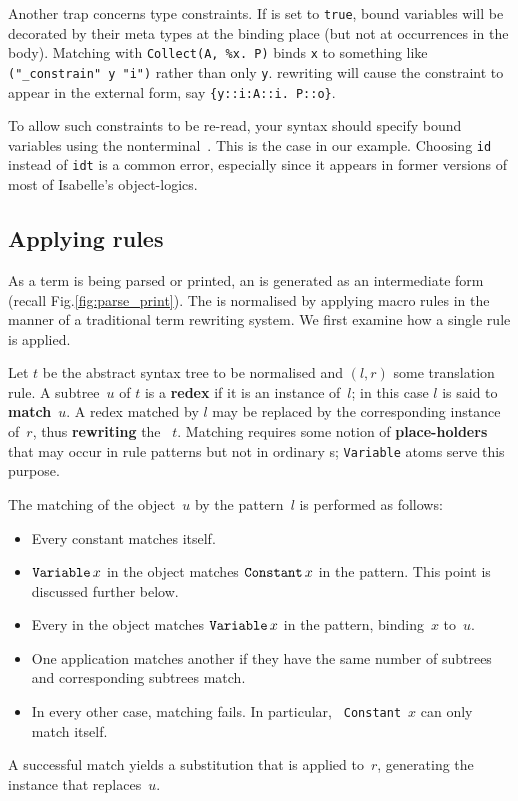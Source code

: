 \begin{warn}
Another trap concerns type constraints.  If  is set to
{\tt true}, bound variables will be decorated by their meta types at the
binding place (but not at occurrences in the body).  Matching with
\verb|Collect(A, %x. P)| binds {\tt x} to something like {\tt ("_constrain" y
"i")} rather than only {\tt y}.  \AST{} rewriting will cause the constraint to
appear in the external form, say \verb|{y::i:A::i. P::o}|.

To allow such constraints to be re-read, your syntax should specify bound
variables using the nonterminal~.  This is the case in our
example.  Choosing {\tt id} instead of {\tt idt} is a common error,
especially since it appears in former versions of most of Isabelle's
object-logics.
\end{warn}



\subsection{Applying rules}
As a term is being parsed or printed, an \AST{} is generated as an
intermediate form (recall Fig.\ts\ref{fig:parse_print}).  The \AST{} is
normalised by applying macro rules in the manner of a traditional term
rewriting system.  We first examine how a single rule is applied.

Let $t$ be the abstract syntax tree to be normalised and $(l, r)$ some
translation rule.  A subtree~$u$ of $t$ is a {\bf redex} if it is an
instance of~$l$; in this case $l$ is said to {\bf match}~$u$.  A redex
matched by $l$ may be replaced by the corresponding instance of~$r$, thus
{\bf rewriting} the \AST~$t$.  Matching requires some notion of {\bf
  place-holders} that may occur in rule patterns but not in ordinary
\AST{}s; {\tt Variable} atoms serve this purpose.

The matching of the object~$u$ by the pattern~$l$ is performed as follows:
\begin{itemize}
  \item Every constant matches itself.

  \item $\mathop{\mbox{\tt Variable}}\nolimits x$ in the object matches $\mathop{\mbox{\tt Constant}}\nolimits x$ in the pattern.
    This point is discussed further below.

  \item Every \AST{} in the object matches $\mathop{\mbox{\tt Variable}}\nolimits x$ in the pattern,
    binding~$x$ to~$u$.

  \item One application matches another if they have the same number of
    subtrees and corresponding subtrees match.

  \item In every other case, matching fails.  In particular, {\tt
      Constant}~$x$ can only match itself.
\end{itemize}
A successful match yields a substitution that is applied to~$r$, generating
the instance that replaces~$u$.

